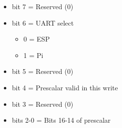 \begin{itemize}
\item[] bit 7 = Reserved (0)
\item[] bit 6 = UART select
  \begin{itemize}
  \item[] 0 = ESP
  \item[] 1 = Pi
  \end{itemize}
\item[] bit 5 = Reserved (0)
\item[] bit 4 = Prescalar valid in this write
\item[] bit 3 = Reserved (0)
\item[] bits 2-0 = Bits 16-14 of prescalar
\end{itemize}

